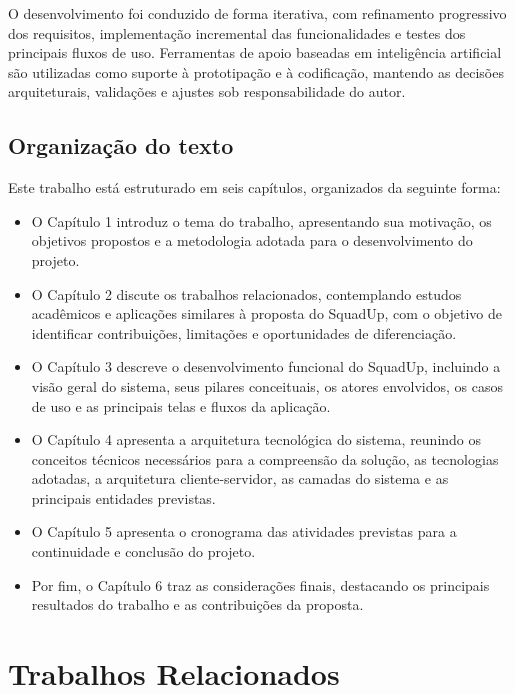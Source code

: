 \documentclass[a4paper, 12pt]{article}
\begin{document}
\begin{justify}
O desenvolvimento foi conduzido de forma iterativa, com refinamento progressivo dos requisitos, implementação incremental das funcionalidades e testes dos principais fluxos de uso. Ferramentas de apoio baseadas em inteligência artificial são utilizadas como suporte à prototipação e à codificação, mantendo as decisões arquiteturais, validações e ajustes sob responsabilidade do autor.

\subsection{Organização do texto}

Este trabalho está estruturado em seis capítulos, organizados da seguinte forma:

\begin{itemize}
    \item O Capítulo 1 introduz o tema do trabalho, apresentando sua motivação, os objetivos propostos e a metodologia adotada para o desenvolvimento do projeto.
    
    \item O Capítulo 2 discute os trabalhos relacionados, contemplando estudos acadêmicos e aplicações similares à proposta do SquadUp, com o objetivo de identificar contribuições, limitações e oportunidades de diferenciação.
    
    \item O Capítulo 3 descreve o desenvolvimento funcional do SquadUp, incluindo a visão geral do sistema, seus pilares conceituais, os atores envolvidos, os casos de uso e as principais telas e fluxos da aplicação.
    
    \item O Capítulo 4 apresenta a arquitetura tecnológica do sistema, reunindo os conceitos técnicos necessários para a compreensão da solução, as tecnologias adotadas, a arquitetura cliente-servidor, as camadas do sistema e as principais entidades previstas.
    
    \item O Capítulo 5 apresenta o cronograma das atividades previstas para a continuidade e conclusão do projeto.
    
    \item Por fim, o Capítulo 6 traz as considerações finais, destacando os principais resultados do trabalho e as contribuições da proposta.
\end{itemize}

\clearpage

\section{Trabalhos Relacionados}


\end{justify}
\end{document}
